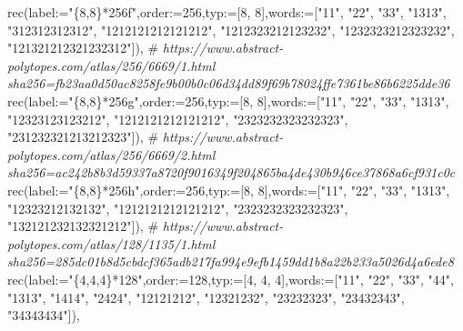 \documentclass[
  10pt,
  letterpaper,
]{article}
\newenvironment{Shaded}{}{}
\newcommand{\CommentTok}[1]{\textcolor[rgb]{0.38,0.63,0.69}{\textit{#1}}}
\newcommand{\ExtensionTok}[1]{#1}
\newcommand{\FloatTok}[1]{\textcolor[rgb]{0.25,0.63,0.44}{#1}}
\newcommand{\NormalTok}[1]{#1}
\newcommand{\OperatorTok}[1]{\textcolor[rgb]{0.40,0.40,0.40}{#1}}
\newcommand{\StringTok}[1]{\textcolor[rgb]{0.25,0.44,0.63}{#1}}
\newcommand{\VariableTok}[1]{\textcolor[rgb]{0.10,0.09,0.49}{#1}}
\begin{document}
\begin{Shaded}
\begin{Highlighting}[]
\ExtensionTok{rec}\NormalTok{(}\VariableTok{label}\OperatorTok{:=}\StringTok{"\{8,8\}*256f"}\OperatorTok{,}\VariableTok{order}\OperatorTok{:=}\FloatTok{256}\OperatorTok{,}\VariableTok{typ}\OperatorTok{:=}\NormalTok{[}\FloatTok{8}\OperatorTok{,} \FloatTok{8}\NormalTok{]}\OperatorTok{,}\VariableTok{words}\OperatorTok{:=}\NormalTok{[}\StringTok{"11"}\OperatorTok{,} \StringTok{"22"}\OperatorTok{,} \StringTok{"33"}\OperatorTok{,} \StringTok{"1313"}\OperatorTok{,} \StringTok{"312312312312"}\OperatorTok{,} \StringTok{"1212121212121212"}\OperatorTok{,} \StringTok{"1212323212123232"}\OperatorTok{,} \StringTok{"1232323212323232"}\OperatorTok{,} \StringTok{"121321212321232312"}\NormalTok{])}\OperatorTok{,}
\NormalTok{\#}\CommentTok{ https://www.abstract{-}polytopes.com/atlas/256/6669/1.html sha256=fb23aa0d50ac8258fe9b00b0c06d34dd89f69b78024ffe7361be86b6225dde36}
\ExtensionTok{rec}\NormalTok{(}\VariableTok{label}\OperatorTok{:=}\StringTok{"\{8,8\}*256g"}\OperatorTok{,}\VariableTok{order}\OperatorTok{:=}\FloatTok{256}\OperatorTok{,}\VariableTok{typ}\OperatorTok{:=}\NormalTok{[}\FloatTok{8}\OperatorTok{,} \FloatTok{8}\NormalTok{]}\OperatorTok{,}\VariableTok{words}\OperatorTok{:=}\NormalTok{[}\StringTok{"11"}\OperatorTok{,} \StringTok{"22"}\OperatorTok{,} \StringTok{"33"}\OperatorTok{,} \StringTok{"1313"}\OperatorTok{,} \StringTok{"12323123123212"}\OperatorTok{,} \StringTok{"1212121212121212"}\OperatorTok{,} \StringTok{"2323232323232323"}\OperatorTok{,} \StringTok{"231232321213212323"}\NormalTok{])}\OperatorTok{,}
\NormalTok{\#}\CommentTok{ https://www.abstract{-}polytopes.com/atlas/256/6669/2.html sha256=ac242b8b3d59337a8720f9016349f204865ba4de430b946ce37868a6cf931c0c}
\ExtensionTok{rec}\NormalTok{(}\VariableTok{label}\OperatorTok{:=}\StringTok{"\{8,8\}*256h"}\OperatorTok{,}\VariableTok{order}\OperatorTok{:=}\FloatTok{256}\OperatorTok{,}\VariableTok{typ}\OperatorTok{:=}\NormalTok{[}\FloatTok{8}\OperatorTok{,} \FloatTok{8}\NormalTok{]}\OperatorTok{,}\VariableTok{words}\OperatorTok{:=}\NormalTok{[}\StringTok{"11"}\OperatorTok{,} \StringTok{"22"}\OperatorTok{,} \StringTok{"33"}\OperatorTok{,} \StringTok{"1313"}\OperatorTok{,} \StringTok{"12323212132132"}\OperatorTok{,} \StringTok{"1212121212121212"}\OperatorTok{,} \StringTok{"2323232323232323"}\OperatorTok{,} \StringTok{"132121232132321212"}\NormalTok{])}\OperatorTok{,}
\NormalTok{\#}\CommentTok{ https://www.abstract{-}polytopes.com/atlas/128/1135/1.html sha256=285dc01b8d5cbdcf365adb217fa994e9efb1459dd1b8a22b233a5026d4a6ede8}
\ExtensionTok{rec}\NormalTok{(}\VariableTok{label}\OperatorTok{:=}\StringTok{"\{4,4,4\}*128"}\OperatorTok{,}\VariableTok{order}\OperatorTok{:=}\FloatTok{128}\OperatorTok{,}\VariableTok{typ}\OperatorTok{:=}\NormalTok{[}\FloatTok{4}\OperatorTok{,} \FloatTok{4}\OperatorTok{,} \FloatTok{4}\NormalTok{]}\OperatorTok{,}\VariableTok{words}\OperatorTok{:=}\NormalTok{[}\StringTok{"11"}\OperatorTok{,} \StringTok{"22"}\OperatorTok{,} \StringTok{"33"}\OperatorTok{,} \StringTok{"44"}\OperatorTok{,} \StringTok{"1313"}\OperatorTok{,} \StringTok{"1414"}\OperatorTok{,} \StringTok{"2424"}\OperatorTok{,} \StringTok{"12121212"}\OperatorTok{,} \StringTok{"12321232"}\OperatorTok{,} \StringTok{"23232323"}\OperatorTok{,} \StringTok{"23432343"}\OperatorTok{,} \StringTok{"34343434"}\NormalTok{])}\OperatorTok{,}

\end{Highlighting}
\end{Shaded}
\end{document}
